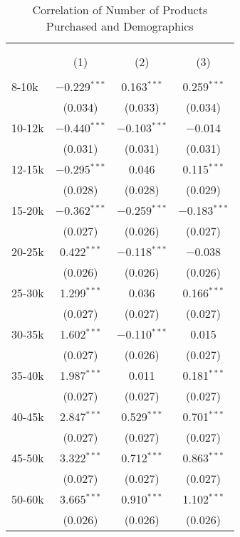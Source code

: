 
\begin{table}[!htbp] \centering 
  \caption{Correlation of Number of Products Purchased and Demographics} 
  \label{tab:transportationCostsItem} 
\begin{tabular}{@{\extracolsep{5pt}}lccc} 
\\[-1.8ex]\hline 
\hline \\[-1.8ex] 
\\[-1.8ex] & (1) & (2) & (3)\\ 
\hline \\[-1.8ex] 
 8-10k & $-$0.229$^{***}$ & 0.163$^{***}$ & 0.259$^{***}$ \\ 
  & (0.034) & (0.033) & (0.034) \\ 
  10-12k & $-$0.440$^{***}$ & $-$0.103$^{***}$ & $-$0.014 \\ 
  & (0.031) & (0.031) & (0.031) \\ 
  12-15k & $-$0.295$^{***}$ & 0.046 & 0.115$^{***}$ \\ 
  & (0.028) & (0.028) & (0.029) \\ 
  15-20k & $-$0.362$^{***}$ & $-$0.259$^{***}$ & $-$0.183$^{***}$ \\ 
  & (0.027) & (0.026) & (0.027) \\ 
  20-25k & 0.422$^{***}$ & $-$0.118$^{***}$ & $-$0.038 \\ 
  & (0.026) & (0.026) & (0.026) \\ 
  25-30k & 1.299$^{***}$ & 0.036 & 0.166$^{***}$ \\ 
  & (0.027) & (0.027) & (0.027) \\ 
  30-35k & 1.602$^{***}$ & $-$0.110$^{***}$ & 0.015 \\ 
  & (0.027) & (0.026) & (0.027) \\ 
  35-40k & 1.987$^{***}$ & 0.011 & 0.181$^{***}$ \\ 
  & (0.027) & (0.027) & (0.027) \\ 
  40-45k & 2.847$^{***}$ & 0.529$^{***}$ & 0.701$^{***}$ \\ 
  & (0.027) & (0.027) & (0.027) \\ 
  45-50k & 3.322$^{***}$ & 0.712$^{***}$ & 0.863$^{***}$ \\ 
  & (0.027) & (0.027) & (0.027) \\ 
  50-60k & 3.665$^{***}$ & 0.910$^{***}$ & 1.102$^{***}$ \\ 
  & (0.026) & (0.026) & (0.026) \\ 

\end{tabular}
\end{table}
